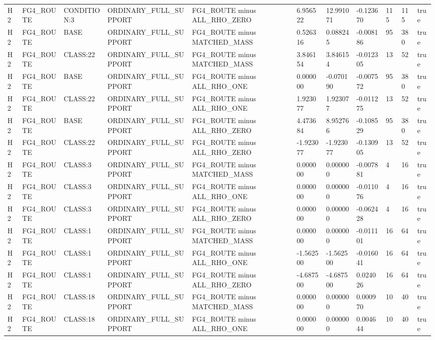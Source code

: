 \begin{tabular}{lllllllllll}
H2 & FG4\_ROUTE & CONDITION:3 & ORDINARY\_FULL\_SUPPORT & FG4\_ROUTE minus ALL\_RHO\_ZERO & 6.956522 & 12.991071 & -0.123670 & 115 & 115 & true \\
H2 & FG4\_ROUTE & BASE & ORDINARY\_FULL\_SUPPORT & FG4\_ROUTE minus MATCHED\_MASS & 0.526316 & 0.088245 & -0.008186 & 95 & 380 & true \\
H2 & FG4\_ROUTE & CLASS:22 & ORDINARY\_FULL\_SUPPORT & FG4\_ROUTE minus MATCHED\_MASS & 3.846154 & 3.846154 & -0.012305 & 13 & 52 & true \\
H2 & FG4\_ROUTE & BASE & ORDINARY\_FULL\_SUPPORT & FG4\_ROUTE minus ALL\_RHO\_ONE & 0.000000 & -0.070190 & -0.007572 & 95 & 380 & true \\
H2 & FG4\_ROUTE & CLASS:22 & ORDINARY\_FULL\_SUPPORT & FG4\_ROUTE minus ALL\_RHO\_ONE & 1.923077 & 1.923077 & -0.011275 & 13 & 52 & true \\
H2 & FG4\_ROUTE & BASE & ORDINARY\_FULL\_SUPPORT & FG4\_ROUTE minus ALL\_RHO\_ZERO & 4.473684 & 8.952766 & -0.108529 & 95 & 380 & true \\
H2 & FG4\_ROUTE & CLASS:22 & ORDINARY\_FULL\_SUPPORT & FG4\_ROUTE minus ALL\_RHO\_ZERO & -1.923077 & -1.923077 & -0.130905 & 13 & 52 & true \\
H2 & FG4\_ROUTE & CLASS:3 & ORDINARY\_FULL\_SUPPORT & FG4\_ROUTE minus MATCHED\_MASS & 0.000000 & 0.000000 & -0.007881 & 4 & 16 & true \\
H2 & FG4\_ROUTE & CLASS:3 & ORDINARY\_FULL\_SUPPORT & FG4\_ROUTE minus ALL\_RHO\_ONE & 0.000000 & 0.000000 & -0.011076 & 4 & 16 & true \\
H2 & FG4\_ROUTE & CLASS:3 & ORDINARY\_FULL\_SUPPORT & FG4\_ROUTE minus ALL\_RHO\_ZERO & 0.000000 & 0.000000 & -0.062428 & 4 & 16 & true \\
H2 & FG4\_ROUTE & CLASS:1 & ORDINARY\_FULL\_SUPPORT & FG4\_ROUTE minus MATCHED\_MASS & 0.000000 & 0.000000 & -0.011101 & 16 & 64 & true \\
H2 & FG4\_ROUTE & CLASS:1 & ORDINARY\_FULL\_SUPPORT & FG4\_ROUTE minus ALL\_RHO\_ONE & -1.562500 & -1.562500 & -0.016041 & 16 & 64 & true \\
H2 & FG4\_ROUTE & CLASS:1 & ORDINARY\_FULL\_SUPPORT & FG4\_ROUTE minus ALL\_RHO\_ZERO & -4.687500 & -4.687500 & 0.024026 & 16 & 64 & true \\
H2 & FG4\_ROUTE & CLASS:18 & ORDINARY\_FULL\_SUPPORT & FG4\_ROUTE minus MATCHED\_MASS & 0.000000 & 0.000000 & 0.000970 & 10 & 40 & true \\
H2 & FG4\_ROUTE & CLASS:18 & ORDINARY\_FULL\_SUPPORT & FG4\_ROUTE minus ALL\_RHO\_ONE & 0.000000 & 0.000000 & 0.004644 & 10 & 40 & true \\

\end{tabular}
